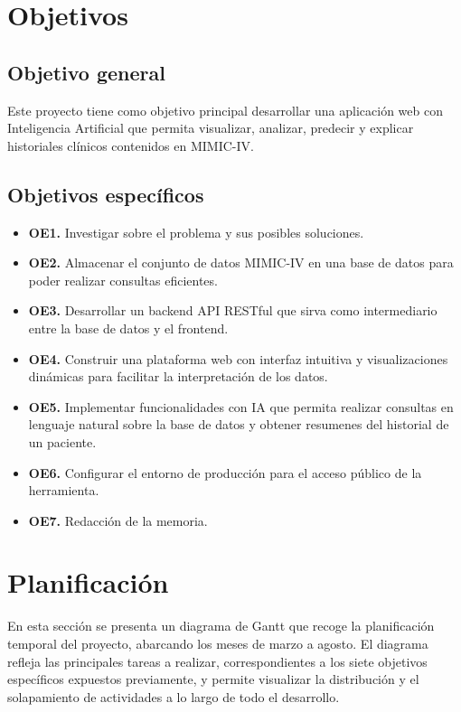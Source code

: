 \section{Objetivos}

\subsection{Objetivo general}

Este proyecto tiene como objetivo principal desarrollar una aplicación web con Inteligencia Artificial que permita visualizar, analizar, predecir y explicar historiales clínicos contenidos en MIMIC-IV.

\subsection{Objetivos específicos}

\begin{itemize}
\item \textbf{OE1.} Investigar sobre el problema y sus posibles soluciones.
\item \textbf{OE2.} Almacenar el conjunto de datos MIMIC-IV en una base de datos para poder realizar consultas eficientes.
\item \textbf{OE3.} Desarrollar un backend API RESTful que sirva como intermediario entre la base de datos y el frontend.
\item \textbf{OE4.} Construir una plataforma web con interfaz intuitiva y visualizaciones dinámicas para facilitar la interpretación de los datos.
\item \textbf{OE5.} Implementar funcionalidades con IA que permita realizar consultas en lenguaje natural sobre la base de datos y obtener resumenes del historial de un paciente.
\item \textbf{OE6.} Configurar el entorno de producción para el acceso público de la herramienta.
\item \textbf{OE7.} Redacción de la memoria.
\end{itemize}

\newpage
\section{Planificación}

En esta sección se presenta un diagrama de Gantt que recoge la planificación temporal del proyecto, abarcando los meses de marzo a agosto. El diagrama refleja las principales tareas a realizar, correspondientes a los siete objetivos específicos expuestos previamente, y permite visualizar la distribución y el solapamiento de actividades a lo largo de todo el desarrollo.

